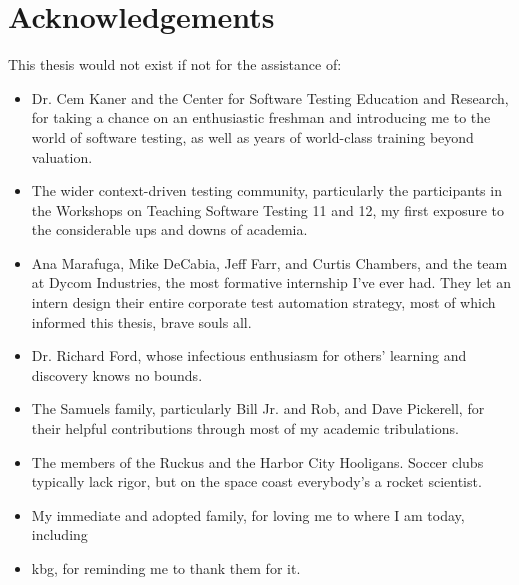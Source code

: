 \chapter*{Acknowledgements}
This thesis would not exist if not for the assistance of:
\begin{itemize}
    \item Dr. Cem Kaner and the Center for Software Testing Education and Research, for taking a chance on an enthusiastic freshman and introducing me to the world of software testing, as well as years of world-class training beyond valuation.

    \item The wider context-driven testing community, particularly the participants in the Workshops on Teaching Software Testing 11 and 12, my first exposure to the considerable ups and downs of academia.

    \item Ana Marafuga, Mike DeCabia, Jeff Farr, and Curtis Chambers, and the team at Dycom Industries, the most formative internship I've ever had. They let an intern design their entire corporate test automation strategy, most of which informed this thesis, brave souls all.

    \item Dr. Richard Ford, whose infectious enthusiasm for others' learning and discovery knows no bounds.

    \item The Samuels family, particularly Bill Jr. and Rob, and Dave Pickerell, for their helpful contributions through most of my academic tribulations.

    \item The members of the Ruckus and the Harbor City Hooligans. Soccer clubs typically lack rigor, but on the space coast everybody's a rocket scientist.

    \item My immediate and adopted family, for loving me to where I am today, including

    \item kbg, for reminding me to thank them for it.
\end{itemize}
